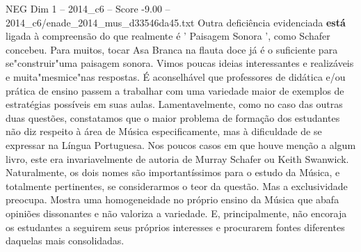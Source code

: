 \begin{textsample}{NEG Dim 1 – 2014\_c6 – Score -9.00 – 2014\_c6/enade\_2014\_mus\_d33546da45.txt}
Outra deficiência evidenciada \textbf{está} ligada à compreensão do que realmente é ' Paisagem Sonora ', como Schafer concebeu.
Para muitos, tocar Asa Branca na flauta doce já é o suficiente para se"construir"uma paisagem sonora.
Vimos poucas ideias interessantes e realizáveis e muita"mesmice"nas respostas.
É aconselhável que professores de didática e/ou prática de ensino passem a trabalhar com uma variedade maior de exemplos de estratégias possíveis em suas aulas.
Lamentavelmente, como no caso das outras duas questões, constatamos que o maior problema de formação dos estudantes não diz respeito à área de Música especificamente, mas à dificuldade de se expressar na Língua Portuguesa.
Nos poucos casos em que houve menção a algum livro, este era invariavelmente de autoria de Murray Schafer ou Keith Swanwick.
Naturalmente, os dois nomes são importantíssimos para o estudo da Música, e totalmente pertinentes, se considerarmos o teor da questão.
Mas a exclusividade preocupa.
Mostra uma homogeneidade no próprio ensino da Música que abafa opiniões dissonantes e não valoriza a variedade.
E, principalmente, não encoraja os estudantes a seguirem seus próprios interesses e procurarem fontes diferentes daquelas mais consolidadas.

\end{textsample}
